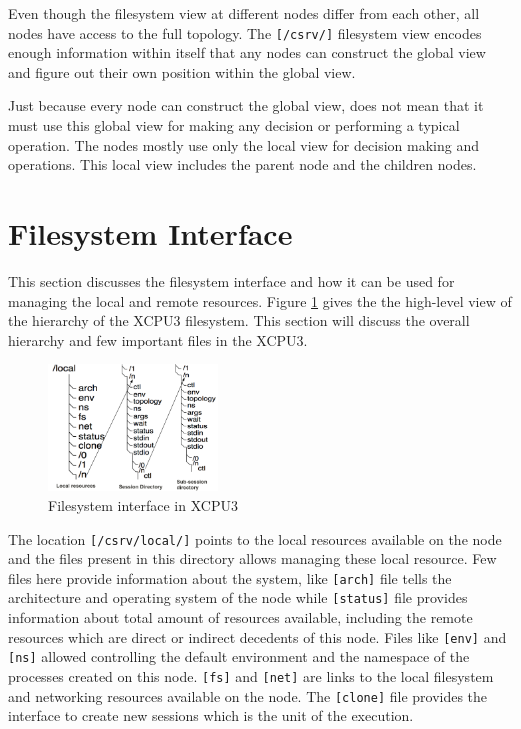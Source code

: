 \documentclass[conference]{IEEEtran}
\begin{document}
Even though the filesystem view at different nodes differ from each other, 
all nodes have access to the full topology.  The \texttt{[/csrv/]} filesystem
view encodes enough information within itself that any nodes can construct the
global view and figure out their own position within the global view.

Just because every node can construct the global view, does not mean that it
must use this global view for making any decision or performing a typical
operation. The nodes mostly use only the local view for decision making and
operations. This local view includes the parent node and the children nodes.


\section{Filesystem Interface}

This section discusses the filesystem interface and how it can be used for
managing the local and remote resources. Figure \ref{fig:xcpu3Local} gives the
the high-level view of the hierarchy of the XCPU3 filesystem.  This section
will discuss the overall hierarchy and few important files in the XCPU3.

\begin{figure}[h]
  \begin{center}
    \leavevmode
      \includegraphics[height=0.25\textheight,width=0.4\textwidth]
		{./img/local_session_subsessions}
    \caption{Filesystem interface in XCPU3}
    \label{fig:xcpu3Local}
  \end{center}
\end{figure}

The location \texttt{[/csrv/local/]} points to the local resources available on
the node and the files present in this directory allows managing these local
resource. Few files here provide information about the system, like
\texttt{[arch]} file tells the architecture and operating system of the node
while \texttt{[status]} file provides information about total amount of
resources available, including the remote resources which are direct or
indirect decedents of this node.  Files like \texttt{[env]} and \texttt{[ns]}
allowed controlling the default environment and the namespace of the processes
created on this node.  \texttt{[fs]} and \texttt{[net]} are links to the local
filesystem and networking resources available on the node.  The
\texttt{[clone]} file provides the interface to create new sessions which is
the unit of the execution.
\end{document}
